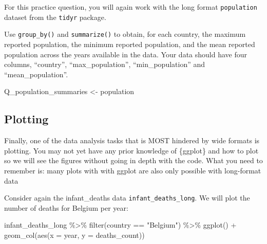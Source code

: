 \documentclass[
  letterpaper,
  DIV=11,
  numbers=noendperiod]{scrreprt}
\newenvironment{Shaded}{\begin{snugshade}}{\end{snugshade}}
\newcommand{\AttributeTok}[1]{\textcolor[rgb]{0.40,0.45,0.13}{#1}}
\newcommand{\FunctionTok}[1]{\textcolor[rgb]{0.28,0.35,0.67}{#1}}
\newcommand{\NormalTok}[1]{\textcolor[rgb]{0.00,0.23,0.31}{#1}}
\newcommand{\OtherTok}[1]{\textcolor[rgb]{0.00,0.23,0.31}{#1}}
\newcommand{\SpecialCharTok}[1]{\textcolor[rgb]{0.37,0.37,0.37}{#1}}
\newcommand{\StringTok}[1]{\textcolor[rgb]{0.13,0.47,0.30}{#1}}
\begin{document}
\begin{tcolorbox}[enhanced jigsaw, title=\textcolor{quarto-callout-tip-color}{\faLightbulb}\hspace{0.5em}{Practice}, colbacktitle=quarto-callout-tip-color!10!white, leftrule=.75mm, arc=.35mm, opacityback=0, bottomrule=.15mm, rightrule=.15mm, toptitle=1mm, breakable, toprule=.15mm, colback=white, coltitle=black, colframe=quarto-callout-tip-color-frame, bottomtitle=1mm, titlerule=0mm, left=2mm, opacitybacktitle=0.6]

For this practice question, you will again work with the long format
\texttt{population} dataset from the \texttt{tidyr} package.

Use \texttt{group\_by()} and \texttt{summarize()} to obtain, for each
country, the maximum reported population, the minimum reported
population, and the mean reported population across the years available
in the data. Your data should have four columns, ``country'',
``max\_population'', ``min\_population'' and ``mean\_population''.

\begin{Shaded}
\begin{Highlighting}[]
\NormalTok{Q\_population\_summaries }\OtherTok{\textless{}{-}} 
\NormalTok{  population}
\end{Highlighting}
\end{Shaded}

\end{tcolorbox}

\subsection{Plotting}\label{plotting}

Finally, one of the data analysis tasks that is MOST hindered by wide
formats is plotting. You may not yet have any prior knowledge of
\{ggplot\} and how to plot so we will see the figures without going in
depth with the code. What you need to remember is: many plots with with
ggplot are also only possible with long-format data

Consider again the infant\_deaths data \texttt{infant\_deaths\_long}. We
will plot the number of deaths for Belgium per year:

\begin{Shaded}
\begin{Highlighting}[]
\NormalTok{infant\_deaths\_long }\SpecialCharTok{\%\textgreater{}\%} 
  \FunctionTok{filter}\NormalTok{(country }\SpecialCharTok{==} \StringTok{"Belgium"}\NormalTok{) }\SpecialCharTok{\%\textgreater{}\%} 
  \FunctionTok{ggplot}\NormalTok{() }\SpecialCharTok{+} 
  \FunctionTok{geom\_col}\NormalTok{(}\FunctionTok{aes}\NormalTok{(}\AttributeTok{x =}\NormalTok{ year, }\AttributeTok{y =}\NormalTok{ deaths\_count))}
\end{Highlighting}
\end{Shaded}
\end{document}
